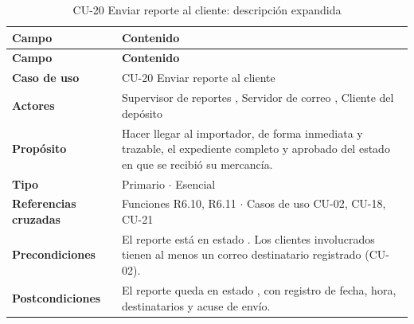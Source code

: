 {\estilotabla
\begin{longtable}{L{0.25\textwidth} L{0.69\textwidth}}

\caption{CU-20 Enviar reporte al cliente: descripción expandida}
\label{tab:cu20_desc}
\\

\toprule
\textbf{Campo} & \textbf{Contenido} \\
\midrule
\endfirsthead

\toprule
\textbf{Campo} & \textbf{Contenido} \\
\midrule
\endhead

\textbf{Caso de uso} & CU-20 Enviar reporte al cliente \\
\midrule
\textbf{Actores} & Supervisor de reportes , Servidor de correo , Cliente del depósito  \\
\midrule
\textbf{Propósito} & Hacer llegar al importador, de forma inmediata y trazable, el expediente
completo y aprobado del estado en que se recibió su mercancía. \\
\midrule
\textbf{Tipo} & Primario $\cdot$ Esencial \\
\midrule
\textbf{Referencias cruzadas} & Funciones R6.10, R6.11 $\cdot$ Casos de uso CU-02, CU-18, CU-21 \\
\midrule
\textbf{Precondiciones} & El reporte está en estado . Los clientes involucrados
tienen al menos un correo destinatario registrado (CU-02). \\
\midrule
\textbf{Postcondiciones} & El reporte queda en estado , con registro de fecha,
hora, destinatarios y acuse de envío. \\

\bottomrule

\end{longtable}
}

